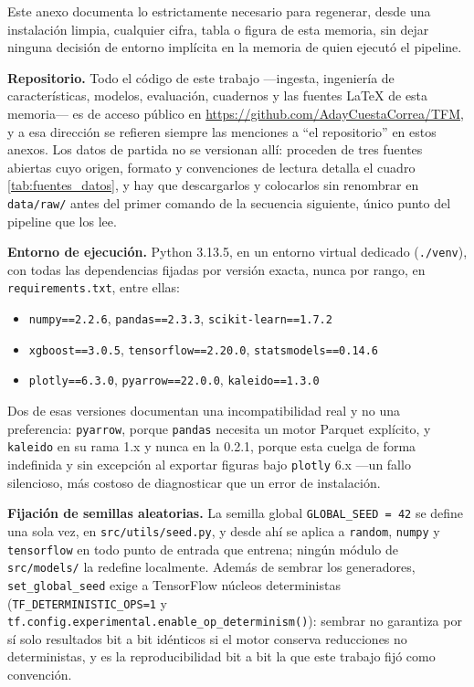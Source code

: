 \begin{sloppypar}

Este anexo documenta lo estrictamente necesario para regenerar, desde una instalación
limpia, cualquier cifra, tabla o figura de esta memoria, sin dejar ninguna decisión de
entorno implícita en la memoria de quien ejecutó el pipeline.

\textbf{Repositorio.} Todo el código de este trabajo ---ingesta, ingeniería de
características, modelos, evaluación, cuadernos y las fuentes \LaTeX{} de esta memoria---
es de acceso público en \url{https://github.com/AdayCuestaCorrea/TFM}, y a esa dirección
se refieren siempre las menciones a ``el repositorio'' en estos anexos. Los datos de
partida no se versionan allí: proceden de tres fuentes abiertas cuyo origen, formato y
convenciones de lectura detalla el cuadro \ref{tab:fuentes_datos}, y hay que descargarlos
y colocarlos sin renombrar en \texttt{data/\allowbreak{}raw/} antes del primer comando de
la secuencia siguiente, único punto del pipeline que los lee.

\textbf{Entorno de ejecución.} Python 3.13.5, en un entorno virtual dedicado
(\texttt{./\allowbreak{}venv}), con todas las dependencias fijadas por versión exacta, nunca por
rango, en \texttt{requirements.txt}, entre ellas:

{\small
\begin{itemize}[nosep]
  \item \texttt{numpy==2.2.6}, \texttt{pandas==2.3.3}, \texttt{scikit-learn==1.7.2}
  \item \texttt{xgboost==3.0.5}, \texttt{tensorflow==2.20.0}, \texttt{statsmodels==0.14.6}
  \item \texttt{plotly==6.3.0}, \texttt{pyarrow==22.0.0}, \texttt{kaleido==1.3.0}
\end{itemize}
}

Dos de esas versiones documentan una incompatibilidad real y no una preferencia:
\texttt{pyarrow}, porque \texttt{pandas} necesita un motor Parquet explícito, y
\texttt{kaleido} en su rama 1.x y nunca en la 0.2.1, porque esta cuelga de forma
indefinida y sin excepción al exportar figuras bajo \texttt{plotly} 6.x ---un fallo
silencioso, más costoso de diagnosticar que un error de instalación.

\textbf{Fijación de semillas aleatorias.} La semilla global \texttt{GLOBAL\_SEED = 42} se
define una sola vez, en \texttt{src/\allowbreak{}utils/\allowbreak{}seed.py}, y desde ahí se
aplica a \texttt{random}, \texttt{numpy} y \texttt{tensorflow} en todo punto de entrada
que entrena; ningún módulo de \texttt{src/\allowbreak{}models/} la redefine localmente.
Además de sembrar los generadores, \texttt{set\_global\_seed} exige a TensorFlow núcleos
deterministas (\texttt{TF\_\allowbreak{}DETERMINISTIC\_\allowbreak{}OPS=1} y
\texttt{tf.config.\allowbreak{}experimental.\allowbreak{}enable\_\allowbreak{}op\_\allowbreak{}determinism()}):
sembrar no garantiza por sí solo resultados bit a bit idénticos si el motor conserva
reducciones no deterministas, y es la reproducibilidad bit a bit la que este trabajo fijó
como convención.


\end{sloppypar}
